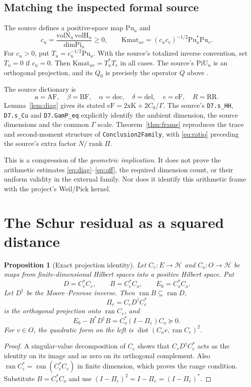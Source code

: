 \documentclass[11pt,letterpaper]{article}
\newtheorem{proposition}[theorem]{Proposition}
\theoremstyle{definition}
\theoremstyle{remark}
\newcommand{\rank}{\operatorname{rank}}
\newcommand{\ran}{\operatorname{ran}}
\numberwithin{equation}{section}
\begin{document}
\subsection{Matching the inspected formal source}
The source defines a positive-space map $\mathrm{Pu}_u$ and
\[
 c_u=\frac{\mathrm{volN}_u\,\mathrm{volH}_u}{\mathrm{dimPi}_u}\ge0,
 \qquad
 \mathrm{Kmat}_{uv}=(c_uc_v)^{-1/2}\mathrm{Pu}_u^*\mathrm{Pu}_v.
\]
For $c_u>0$, put $T_u=c_u^{-1/2}\mathrm{Pu}_u$. With the source's totalized inverse convention, set $T_u=0$ if $c_u=0$. Then $\mathrm{Kmat}_{uv}=T_u^*T_v$ in all cases. The source's $\mathrm{PiU}_u$ is an orthogonal projection, and its $Q_0$ is precisely the operator $Q$ above \cite{gram,frame}.

The source dictionary is
\[
 a=\mathrm{AF},\quad \beta=\mathrm{BF},\quad
 \alpha=\mathrm{dec},\quad \delta=\mathrm{del},\quad
 e=\mathrm{eF},\quad R=\mathrm{RR}.
\]
Lemma~\ref{lem:diag} gives its stated $\mathrm{eF}=2\mathrm{xK}+2C_0/\Gamma$. The source's \texttt{D7.s\_HH}, \texttt{D7.s\_Cu} and \texttt{D7.GamP\_eq} explicitly identify the ambient dimension, the source dimensions and the common $\Gamma$ scale. Theorem~\ref{thm:frame} reproduces the trace and second-moment structure of \texttt{Conclusion2Family}, with \eqref{eq:ratio} preceding the source's extra factor $N/\rank\Pi$.

This is a compression of the \emph{geometric implication}. It does not prove the arithmetic estimates \eqref{eq:diag}--\eqref{eq:off}, the required dimension count, or their uniform validity in the external family. Nor does it identify this arithmetic frame with the project's Weil/Pick kernel.

\section{The Schur residual as a squared distance}

\begin{proposition}[Exact projection identity]\label{prop:schur}
Let $C_e:E\to\mathcal H$ and $C_o:O\to\mathcal H$ be maps from finite-dimensional Hilbert spaces into a positive Hilbert space. Put
\[
 D=C_e^*C_e,\qquad B=C_e^*C_o,\qquad E_0=C_o^*C_o.
\]
Let $D^\dagger$ be the Moore--Penrose inverse. Then $\ran B\subseteq\ran D$,
\[
 \Pi_e=C_eD^\dagger C_e^*
\]
is the orthogonal projection onto $\ran C_e$, and
\[
 \boxed{E_0-B^*D^\dagger B=C_o^*(I-\Pi_e)C_o\succeq0.}
\]
For $v\in O$, the quadratic form on the left is $\operatorname{dist}(C_ov,\ran C_e)^2$.
\end{proposition}
\begin{proof}
A singular-value decomposition of $C_e$ shows that $C_eD^\dagger C_e^*$ acts as the identity on its image and as zero on its orthogonal complement. Also $\ran C_e^*=\ran(C_e^*C_e)$ in finite dimension, which proves the range condition. Substitute $B=C_e^*C_o$ and use $(I-\Pi_e)^2=I-\Pi_e=(I-\Pi_e)^*$.
\end{proof}
\end{document}
